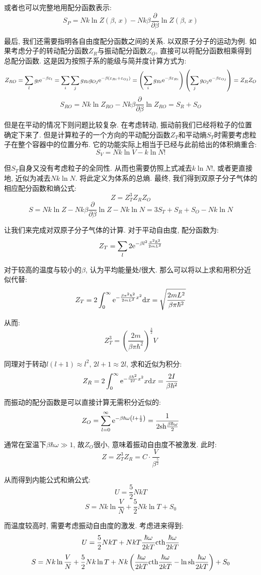 或者也可以完整地用配分函数表示:
\[S_P=Nk\ln Z(\beta,\,x)-Nk\beta\frac{\partial}{\partial \beta}\ln Z(\beta,\,x)\]

最后, 我们还需要指明各自由度配分函数之间的关系. 以双原子分子的运动为例. 如果考虑分子的转动配分函数$Z_R$与振动配分函数$Z_O$, 直接可以将配分函数相乘得到总配分函数. 这是因为按照子系的能级与简并度计算方式为:
\[Z_{RO}=\sum_l g_l{\rm e}^{-\beta \varepsilon_l}=\sum_i\sum_j g_{Ri}g_{Oj}{\rm e}^{-\beta\left(\varepsilon_{Ri}+\varepsilon_{Oj}\right)}=\left(\sum_ig_{Ri}{\rm e}^{-\beta\varepsilon_{Ri}}\right)\left(\sum_jg_{Oj}{\rm e}^{-\beta\varepsilon_{Oj}}\right)=Z_RZ_O\]
\[S_{RO}=Nk\ln Z_{RO}-Nk\beta\frac{\partial}{\partial \beta}\ln Z_{RO}=S_R+S_O\]

但是在平动的情况下则问题比较复杂. 在考虑转动, 振动前我们已经将粒子的位置确定下来了. 但是计算粒子的一个方向的平动配分函数$Z_T$和平动熵$S_T$时需要考虑粒子在整个容器中的位置分布. 它的功能实际上相当于已经与此前给出的体积熵重合:
\[S_V=Nk\ln V-k\ln N!\]

但$S_T$自身又没有考虑粒子的全同性. 从而也需要仿照上式减去$k\ln N!$, 或者更直接地, 近似为减去$Nk\ln N$. 将此定义为体系的总熵. 最终, 我们得到双原子分子气体的相应配分函数和熵公式:
\[Z=Z_T^3Z_RZ_O\]
\[S=Nk\ln Z-Nk\beta\frac{\partial}{\partial \beta}\ln Z-Nk\ln N=3S_T+S_R+S_O-Nk\ln N\]

让我们来完成对双原子分子气体的计算. 对于平动自由度, 配分函数为:
\[Z_T=\sum_l 2{\rm e}^{-\beta l^2\frac{\pi^2\hbar^2}{2mL^2}}\]

对于较高的温度与较小的$\beta$, 认为平均能量处$l$很大. 那么可以将以上求和用积分近似代替:
\[Z_T=2\int_0^\infty {\rm e}^{-\frac{\beta\pi^2\hbar^2}{2mL^2}x^2}\textrm{d} x=\sqrt{\frac{2mL^2}{\beta\pi\hbar^2}} \]

从而:
\[Z_T^3=\left(\frac{2m}{\beta\pi\hbar^2}\right)^{\frac{3}{2}}V\]

同理对于转动$l(l+1)\approx l^2$, $2l+1\approx 2l$, 求和近似为积分:
\[Z_R=2\int_0^\infty {\rm e}^{-\frac{\beta\hbar^2}{2I}x^2}x\textrm{d} x=\frac{2I}{\beta \hbar^2}\]

而振动的配分函数是可以直接计算无需积分近似的:
\[Z_O=\sum_{l=0}^\infty {\rm e}^{-\beta \hbar \omega \left(l+\frac{1}{2}\right)}=\frac{1}{2{\rm sh}\frac{\beta\hbar\omega}{2}}\]

通常在室温下$\beta \hbar \omega\gg 1$, 故$Z_O$很小, 意味着振动自由度不被激发. 此时:
\[Z=Z_T^3Z_R=C\cdot \frac{V}{\beta^\frac{5}{2}}\]

从而得到内能公式和熵公式:
\[U=\frac{5}{2}NkT\]
\[S=Nk\ln\frac{V}{N}+\frac{5}{2}Nk\ln T+S_0\]

而温度较高时, 需要考虑振动自由度的激发. 考虑进来得到:
\[U=\frac{5}{2}NkT+NkT\frac{\hbar\omega}{2kT}{\rm cth}\frac{\hbar\omega}{2kT}\]
\[S=Nk\ln\frac{V}{N}+\frac{5}{2}Nk\ln T+Nk \left(\frac{\hbar\omega}{2kT}{\rm cth}\frac{\hbar\omega}{2kT}-\ln{\rm sh}\frac{\hbar\omega}{2kT}\right) +S_0\]
